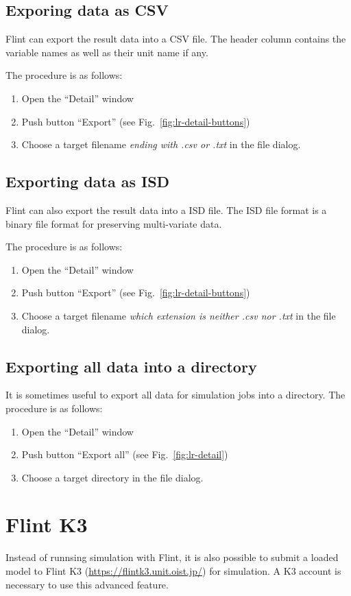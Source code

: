\documentclass[a4paper,10pt]{report}
\begin{document}
\subsection{Exporing data as CSV}
Flint can export the result data into a CSV file.
The header column contains the variable names as well as their unit name if any.

The procedure is as follows:
\begin{enumerate}
\item Open the ``Detail'' window
\item Push button ``Export'' (see Fig.~\ref{fig:lr-detail-buttons})
\item Choose a target filename \emph{ending with .csv or .txt} in the file dialog.
\end{enumerate}

\subsection{Exporting data as ISD}
Flint can also export the result data into a ISD file.
The ISD file format is a binary file format for preserving multi-variate data.

The procedure is as follows:
\begin{enumerate}
\item Open the ``Detail'' window
\item Push button ``Export'' (see Fig.~\ref{fig:lr-detail-buttons})
\item Choose a target filename \emph{which extension is neither .csv nor .txt}
  in the file dialog.
\end{enumerate}

\subsection{Exporting all data into a directory}
It is sometimes useful to export all data for simulation jobs into a directory.
The procedure is as follows:
\begin{enumerate}
\item Open the ``Detail'' window
\item Push button ``Export all'' (see Fig.~\ref{fig:lr-detail})
\item Choose a target directory in the file dialog.
\end{enumerate}

\section{Flint K3}
Instead of runnsing simulation with Flint, it is also possible to submit a loaded
model to Flint K3 (\url{https://flintk3.unit.oist.jp/}) for simulation.
A K3 account is necessary to use this advanced feature.
\end{document}
